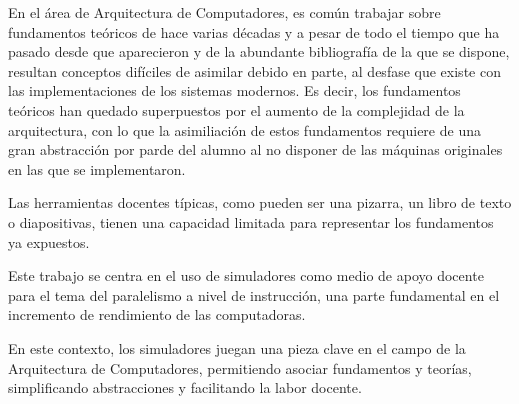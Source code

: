 En el área de Arquitectura de Computadores, es común trabajar sobre fundamentos teóricos
de hace varias décadas y a pesar de todo el tiempo que ha pasado desde 
que aparecieron y de la abundante bibliografía de la que se
dispone, resultan conceptos difíciles de asimilar debido en parte, al desfase que existe
con las implementaciones de los sistemas modernos. Es decir, los fundamentos teóricos
han quedado superpuestos por el aumento de la complejidad de la arquitectura, con lo que la 
asimiliación de estos fundamentos requiere de una gran abstracción por parde  del alumno al 
no disponer de las máquinas originales en las que se implementaron.

\bigskip
Las herramientas docentes típicas, como pueden ser una pizarra, un libro de texto
o diapositivas, tienen una capacidad limitada para representar los fundamentos
ya expuestos.

\bigskip
Este trabajo se centra en el uso de simuladores como medio de apoyo docente para el 
tema del  paralelismo a nivel de instrucción, una parte fundamental en el incremento
de rendimiento de las computadoras.

\bigskip
En este contexto, los simuladores juegan una pieza clave en el campo de la Arquitectura de Computadores,
permitiendo asociar fundamentos y teorías, simplificando abstracciones y facilitando la labor docente.